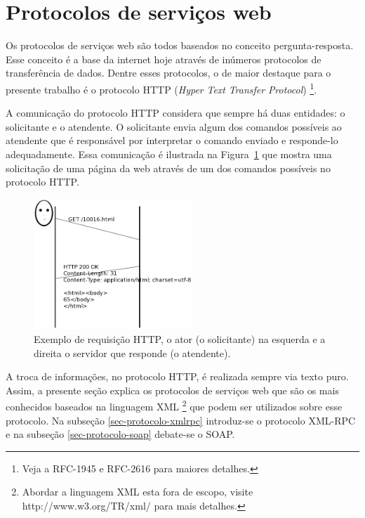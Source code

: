 \section{Protocolos de serviços web} \label{sec-protocolo}

Os protocolos de serviços web são todos baseados no conceito pergunta-resposta.
Esse conceito é a base da internet hoje através de inúmeros protocolos de
transferência de dados. Dentre esses protocolos, o de maior destaque para o
presente trabalho é o protocolo HTTP (\emph{Hyper} \emph{Text} \emph{Transfer}
\emph{Protocol}) \footnote{Veja a RFC-1945 e RFC-2616 para maiores detalhes.}.

A comunicação do protocolo HTTP considera que sempre há duas entidades: o
solicitante e o atendente. O solicitante envia algum dos comandos possíveis
ao atendente que é responsável por interpretar o comando enviado e responde-lo
adequadamente. Essa comunicação é ilustrada na Figura~\ref{fig-http} que mostra
uma solicitação de uma página da web através de um dos comandos possíveis
no protocolo HTTP.

\begin{figure}
	\begin{center}
	\includegraphics[width=60mm]{figuras/http-request.png} 
	\end{center}
	\caption{Exemplo de requisição HTTP, o ator (o solicitante) na esquerda e a direita o servidor que responde (o atendente).}
	\label{fig-http}
\end{figure}

A troca de informações, no protocolo HTTP, é realizada sempre via texto puro.
Assim, a presente seção explica os protocolos de serviços web que são
os mais conhecidos baseados na linguagem XML \footnote{Abordar a linguagem
XML esta fora de escopo, visite http://www.w3.org/TR/xml/ para mais detalhes.}
que podem ser utilizados sobre esse protocolo.
Na subseção \ref{sec-protocolo-xmlrpc} introduz-se o protocolo XML-RPC e na
subseção \ref{sec-protocolo-soap} debate-se o SOAP.

